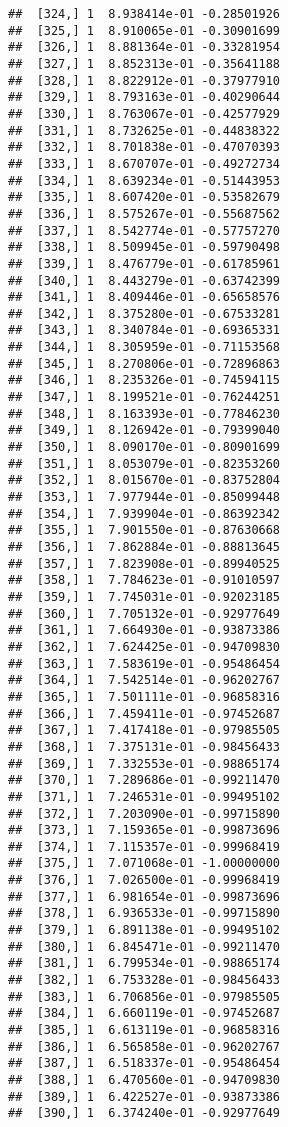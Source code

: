 \documentclass[
  12pt,
]{article}
\begin{document}
\begin{verbatim}
##  [324,] 1  8.938414e-01 -0.28501926
##  [325,] 1  8.910065e-01 -0.30901699
##  [326,] 1  8.881364e-01 -0.33281954
##  [327,] 1  8.852313e-01 -0.35641188
##  [328,] 1  8.822912e-01 -0.37977910
##  [329,] 1  8.793163e-01 -0.40290644
##  [330,] 1  8.763067e-01 -0.42577929
##  [331,] 1  8.732625e-01 -0.44838322
##  [332,] 1  8.701838e-01 -0.47070393
##  [333,] 1  8.670707e-01 -0.49272734
##  [334,] 1  8.639234e-01 -0.51443953
##  [335,] 1  8.607420e-01 -0.53582679
##  [336,] 1  8.575267e-01 -0.55687562
##  [337,] 1  8.542774e-01 -0.57757270
##  [338,] 1  8.509945e-01 -0.59790498
##  [339,] 1  8.476779e-01 -0.61785961
##  [340,] 1  8.443279e-01 -0.63742399
##  [341,] 1  8.409446e-01 -0.65658576
##  [342,] 1  8.375280e-01 -0.67533281
##  [343,] 1  8.340784e-01 -0.69365331
##  [344,] 1  8.305959e-01 -0.71153568
##  [345,] 1  8.270806e-01 -0.72896863
##  [346,] 1  8.235326e-01 -0.74594115
##  [347,] 1  8.199521e-01 -0.76244251
##  [348,] 1  8.163393e-01 -0.77846230
##  [349,] 1  8.126942e-01 -0.79399040
##  [350,] 1  8.090170e-01 -0.80901699
##  [351,] 1  8.053079e-01 -0.82353260
##  [352,] 1  8.015670e-01 -0.83752804
##  [353,] 1  7.977944e-01 -0.85099448
##  [354,] 1  7.939904e-01 -0.86392342
##  [355,] 1  7.901550e-01 -0.87630668
##  [356,] 1  7.862884e-01 -0.88813645
##  [357,] 1  7.823908e-01 -0.89940525
##  [358,] 1  7.784623e-01 -0.91010597
##  [359,] 1  7.745031e-01 -0.92023185
##  [360,] 1  7.705132e-01 -0.92977649
##  [361,] 1  7.664930e-01 -0.93873386
##  [362,] 1  7.624425e-01 -0.94709830
##  [363,] 1  7.583619e-01 -0.95486454
##  [364,] 1  7.542514e-01 -0.96202767
##  [365,] 1  7.501111e-01 -0.96858316
##  [366,] 1  7.459411e-01 -0.97452687
##  [367,] 1  7.417418e-01 -0.97985505
##  [368,] 1  7.375131e-01 -0.98456433
##  [369,] 1  7.332553e-01 -0.98865174
##  [370,] 1  7.289686e-01 -0.99211470
##  [371,] 1  7.246531e-01 -0.99495102
##  [372,] 1  7.203090e-01 -0.99715890
##  [373,] 1  7.159365e-01 -0.99873696
##  [374,] 1  7.115357e-01 -0.99968419
##  [375,] 1  7.071068e-01 -1.00000000
##  [376,] 1  7.026500e-01 -0.99968419
##  [377,] 1  6.981654e-01 -0.99873696
##  [378,] 1  6.936533e-01 -0.99715890
##  [379,] 1  6.891138e-01 -0.99495102
##  [380,] 1  6.845471e-01 -0.99211470
##  [381,] 1  6.799534e-01 -0.98865174
##  [382,] 1  6.753328e-01 -0.98456433
##  [383,] 1  6.706856e-01 -0.97985505
##  [384,] 1  6.660119e-01 -0.97452687
##  [385,] 1  6.613119e-01 -0.96858316
##  [386,] 1  6.565858e-01 -0.96202767
##  [387,] 1  6.518337e-01 -0.95486454
##  [388,] 1  6.470560e-01 -0.94709830
##  [389,] 1  6.422527e-01 -0.93873386
##  [390,] 1  6.374240e-01 -0.92977649

\end{verbatim}
\end{document}
